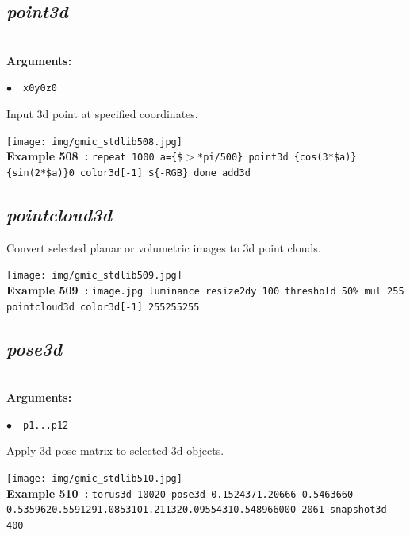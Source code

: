 \documentclass[a4paper,10.5pt,twoside]{book}
\def\comma{\discretionary{,}{}{,}}
\newcommand{\Cb}[1]{\textcolor{cb}{#1}}
\begin{document}
\subsection{\emph{point3d} }\vspace*{-0.7em}
~\\\textbf{\Cb{Arguments: }}\begin{flushleft}
{\small \Cb{\hspace*{0.5cm}$\bullet$~~\texttt{x0{\comma}y0{\comma}z0}}}\end{flushleft}
Input 3d point at specified coordinates.
\begin{center}\texttt{[image: img/gmic\_stdlib508.jpg]}\\
{\footnotesize \textbf{Example 508~:} \texttt{repeat 1000 a=\{\$$>$*pi/500\} point3d \{cos(3*\$a)\}{\comma}\{sin(2*\$a)\}{\comma}0 color3d[-1] \$\{-RGB\} done add3d}}
\end{center}

\subsection{\emph{pointcloud3d} }\vspace*{-0.7em}
Convert selected planar or volumetric images to 3d point clouds.
\begin{center}\texttt{[image: img/gmic\_stdlib509.jpg]}\\
{\footnotesize \textbf{Example 509~:} \texttt{image.jpg luminance resize2dy 100 threshold 50\% mul 255 pointcloud3d color3d[-1] 255{\comma}255{\comma}255}}
\end{center}

\subsection{\emph{pose3d} }\vspace*{-0.7em}
~\\\textbf{\Cb{Arguments: }}\begin{flushleft}
{\small \Cb{\hspace*{0.5cm}$\bullet$~~\texttt{p1{\comma}...{\comma}p12}}}\end{flushleft}
Apply 3d pose matrix to selected 3d objects.
\begin{center}\texttt{[image: img/gmic\_stdlib510.jpg]}\\
{\footnotesize \textbf{Example 510~:} \texttt{torus3d 100{\comma}20 pose3d 0.152437{\comma}1.20666{\comma}-0.546366{\comma}0{\comma}-0.535962{\comma}0.559129{\comma}1.08531{\comma}0{\comma}1.21132{\comma}0.0955431{\comma}0.548966{\comma}0{\comma}0{\comma}0{\comma}-206{\comma}1 snapshot3d 400}}
\end{center}
\end{document}

